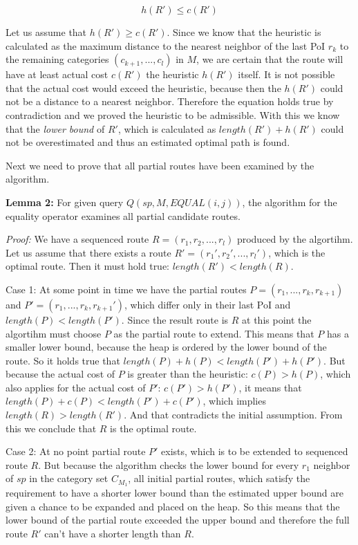 \begin{equation}
h(R') \leq c(R')
\end{equation} 

Let us assume that $h(R') \geq c(R')$. Since we know that the heuristic is calculated as the maximum distance to the nearest neighbor of the last PoI $r_k$ to the remaining categories $(c_{k+1}, ..., c_l)$ in $M$, we are certain that the route will have at least actual cost $c(R')$ the heuristic $h(R')$ itself. It is not possible that the actual cost would exceed the heuristic, because then the $h(R')$ could not be a distance to a nearest neighbor. Therefore the equation holds true by contradiction and we proved the heuristic to be admissible. With this we know that the \textit{lower bound} of $R'$, which is calculated as $length(R') + h(R')$ could not be overestimated and thus an estimated optimal path is found.

Next we need to prove that all partial routes have been examined by the algorithm.

\textbf{Lemma 2:} For given query $Q(sp, M, EQUAL(i, j))$, the algorithm for the equality operator examines all partial candidate routes.

\textit{Proof:} We have a sequenced route $R = (r_1, r_2, ..., r_l)$ produced by the algortihm. Let us assume that there exists a route $R' = (r_1', r_2', ..., r_l')$, which is the optimal route. Then it must hold true: $length(R') < length(R)$. 

Case 1: At some point in time we have the partial routes $P = (r_1, ..., r_k, r_{k+1})$ and $P' = (r_1, ..., r_k, r_{k+1}')$, which differ only in their last PoI and $length(P) < length(P')$. Since the result route is $R$ at this point the algortihm must choose $P$ as the partial route to extend. This means that $P$ has a smaller lower bound, because the heap is ordered by the lower bound of the route. So it holds true that $length(P) + h(P) < length(P') + h(P')$. But because the actual cost of $P$ is greater than the heuristic: $c(P) > h(P)$, which also applies for the actual cost of $P'$: $c(P') > h(P')$, it means that $length(P) + c(P) < length(P') + c(P')$, which implies $length(R) > length(R')$. And that contradicts the initial assumption. From this we conclude that $R$ is the optimal route.

Case 2: At no point partial route $P'$ exists, which is to be extended to sequenced route $R$. But because the algorithm checks the lower bound for every $r_1$ neighbor of $sp$ in the category set $C_{M_1}$, all initial partial routes, which satisfy the requirement to have a shorter lower bound than the estimated upper bound are given a chance to be expanded and placed on the heap. So this means that the lower bound of the partial route exceeded the upper bound and therefore the full route $R'$ can't have a shorter length than $R$.

